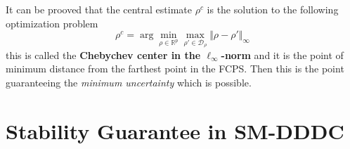 \begin{remark}
    It can be prooved that the central estimate $\rho^c$ is the solution to the following optimization problem
    \begin{equation}
        \rho^c = \arg \min_{\rho\in\mathbb{R}^p} \max_{\rho'\in\mathcal{D}_{\rho}} {
            \Vert \rho-\rho'\Vert_\infty
        }
    \end{equation}
    this is called the \textbf{Chebychev center in the $\ell_\infty$-norm} and it is the point of minimum distance from the farthest point in the FCPS. Then this is the point guaranteeing the \textit{minimum uncertainty} which is possible.
\end{remark}

\section{Stability Guarantee in SM-DDDC}





